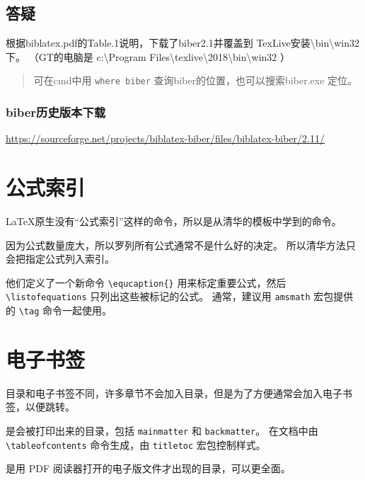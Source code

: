 \documentclass[../Main/thesis.tex]{subfiles}
\begin{document}
\subsection{答疑}

根据biblatex.pdf的Table.1说明，下载了biber2.1并覆盖到 TexLive安装\textbackslash bin\textbackslash win32下。
（GT的电脑是 c:\textbackslash Program Files\textbackslash texlive\textbackslash 2018\textbackslash bin\textbackslash win32 ）

\begin{quote}
可在cmd中用 \texttt{where\ biber} 查询biber的位置，也可以搜索biber.exe 定位。
\end{quote}

\subsubsection{biber历史版本下载}

\url{https://sourceforge.net/projects/biblatex-biber/files/biblatex-biber/2.11/}

\section{公式索引}

\LaTeX 原生没有“公式索引”这样的命令，所以是从清华的模板中学到的命令。

因为公式数量庞大，所以罗列所有公式通常不是什么好的决定。
所以清华方法只会把指定公式列入索引。

他们定义了一个新命令 \texttt{\textbackslash{}equcaption\{\}} 用来标定重要公式，然后 \texttt{\textbackslash{}listofequations} 只列出这些被标记的公式。
通常，建议用 \texttt{amsmath} 宏包提供的 \texttt{\textbackslash{}tag} 命令一起使用。

\section{电子书签}

目录和电子书签不同，许多章节不会加入目录，但是为了方便通常会加入电子书签，以便跳转。

\begin{description}[style=nextline]
  \item[目录] 是会被打印出来的目录，包括 \texttt{mainmatter} 和 \texttt{backmatter}。
  在文档中由 \texttt{\textbackslash{}tableofcontents} 命令生成，由 \texttt{titletoc} 宏包控制样式。
  \item [PDF电子书签] 是用 PDF 阅读器打开的电子版文件才出现的目录，可以更全面。
\end{description}
\end{document}
